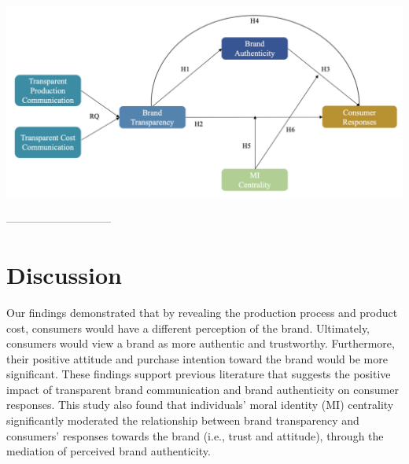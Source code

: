 \documentclass[a0,portrait]{a0poster}
\begin{document}
\begin{minipage}[c]{\linewidth}
\begin{framed}
\begin{multicols}{2}
\begin{center}
\includegraphics[width=0.9\linewidth]{figures/placeholder}
\label{ALICerros}
\end{center}
-----------------------------
\color{Maroon}
\section*{Discussion}
\color{Black}
Our findings demonstrated that by revealing the production process and product cost, consumers would have a different perception of the brand. Ultimately, consumers would view a brand as more authentic and trustworthy. Furthermore, their positive attitude and purchase intention toward the brand would be more significant. These findings support previous literature that suggests the positive impact of transparent brand communication and brand authenticity on consumer responses. This study also found that individuals’ moral identity (MI) centrality significantly
moderated the relationship between brand transparency and consumers’ responses towards the brand (i.e., trust and attitude), through the mediation of perceived brand authenticity.


\color{Maroon} \\
\color{Black}
\printbibliography
\end{multicols}
\vspace{0.5cm}
\end{framed}
\end{minipage}
\end{document}
